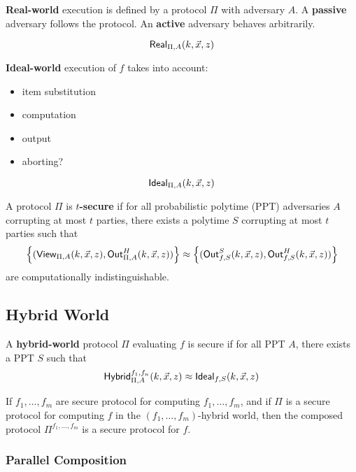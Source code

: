 \begin{defn}
\textbf{Real-world} execution is defined by a protocol $\Pi$ with adversary $A$.
A \textbf{passive} adversary follows the protocol.
An \textbf{active} adversary behaves arbitrarily.

\[
\mathsf{Real}_{\Pi, A}(k, \vec{x}, z)
\]
\end{defn}

\begin{defn}
\textbf{Ideal-world} execution of $f$ takes into account:
\begin{itemize}
    \item item substitution
    \item computation
    \item output
    \item aborting?
\end{itemize}

\[
\mathsf{Ideal}_{\Pi, A}(k, \vec{x}, z)
\]
\end{defn}

\begin{defn}
A protocol $\Pi$ is \textbf{$t$-secure} if for all probabilistic polytime (PPT) adversaries $A$ corrupting at most $t$ parties, there exists a polytime $S$ corrupting at most $t$ parties such that 
\[ 
    \left\{(\mathsf{View}_{\Pi, A}(k, \vec{x}, z), \mathsf{Out}_{\Pi, A}^H(k, \vec{x}, z))\right\}
    \approx 
    \left\{(\mathsf{Out}_{f,S}^S(k, \vec{x}, z), \mathsf{Out}_{f,S}^H(k, \vec{x}, z))\right\}
\]
are computationally indistinguishable.
\end{defn}

\subsection{Hybrid World}

\begin{defn}
A \textbf{hybrid-world} protocol $\Pi$ evaluating $f$ is secure if for all PPT $A$, there exists a PPT $S$ such that
\[
    \mathsf{Hybrid}_{\Pi, A}^{f_1, f_n}(k, \vec{x}, z) \approx \mathsf{Ideal}_{f, S}(k, \vec{x}, z)
\]
\end{defn}

\begin{thm}
If $f_1, \dots, f_m$ are secure protocol for computing $f_1, \dots, f_m$, and if $\Pi$ is a secure protocol for computing $f$ in the $(f_1, \dots, f_m)$-hybrid world, then the composed protocol $\Pi^{f_1, \dots, f_m}$ is a secure protocol for $f$.
\end{thm}

\subsubsection{Parallel Composition}

